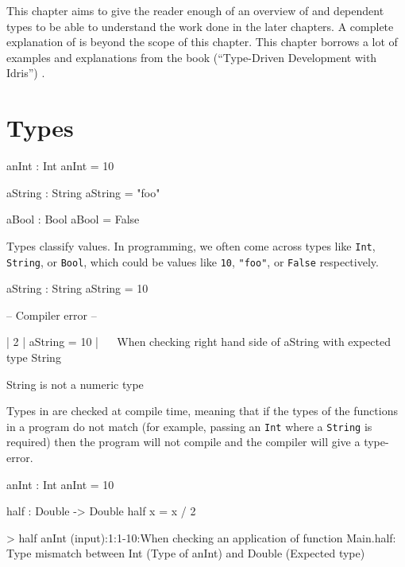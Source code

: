 This chapter aims to give the reader enough of an overview of \Idris and dependent types to be able to understand the work done in the later chapters. A complete explanation of \Idris is beyond the scope of this chapter. This chapter borrows a lot of examples and explanations from the \Idris book (``Type-Driven Development with Idris'') \cite{brady_2017}.

\section{Types}

    \begin{code}[caption={In \Idris, the type of a function is specified using `\texttt{:}'}]
        anInt : Int
        anInt = 10
        
        aString : String
        aString = "foo"
        
        aBool : Bool
        aBool = False
    \end{code}

    Types classify values. In programming, we often come across types like \texttt{Int}, \texttt{String}, or \texttt{Bool}, which could be values like \texttt{10}, \texttt{"foo"}, or \texttt{False} respectively.

    \newpage

    \begin{code}[caption={Mismatching types}, escapeinside={(*}{*)}]
        aString : String
        aString = 10
        
        
        -- Compiler error --
        
          |
        2 | aString = 10
          |           ~~
        When checking right hand side of aString with expected type
        String
        
        String is not a numeric type
    \end{code}
    Types in \Idris are checked at compile time, meaning that if the types of the functions in a program do not match (for example, passing an \texttt{Int} where a \texttt{String} is required) then the program will not compile and the compiler will give a type-error.
    
    \begin{code}[label={des:no-cast}, caption={Values are not automatically cast}]
anInt : Int
anInt = 10

half : Double -> Double
half x = x / 2


> half anInt
(input):1:1-10:When checking an application of function Main.half:
        Type mismatch between
                Int (Type of anInt)
        and
                Double (Expected type)
    \end{code}
    
